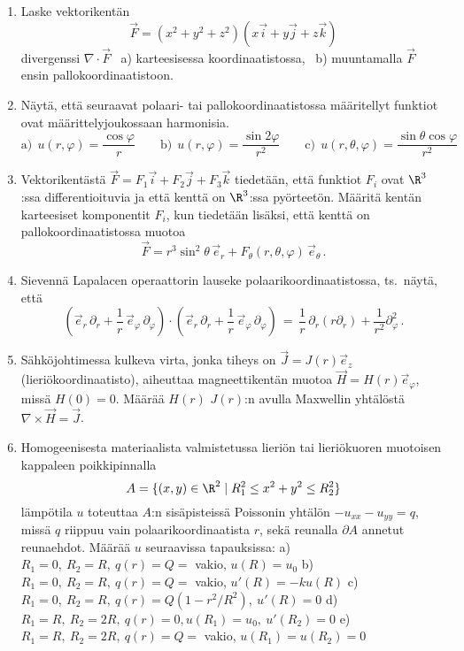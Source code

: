 \Harj
\begin{enumerate}

\item
Laske vektorikentän
\[
\vec F=(x^2+y^2+z^2)(x\vec i+y\vec j+z\vec k)
\]
divergenssi $\nabla\cdot\vec F$ \ a) karteesisessa koordinaatistossa, \ b) muuntamalla $\vec F$
ensin pallokoordinaatistoon.

\item
Näytä, että seuraavat polaari- tai pallokoordinaatistossa määritellyt funktiot ovat 
määrittelyjoukossaan harmonisia.
\[
\text{a)}\ \ u(r,\varphi)=\frac{\cos\varphi}{r} \qquad
\text{b)}\ \ u(r,\varphi)=\frac{\sin 2\varphi}{r^2} \qquad
\text{c)}\ \ u(r,\theta,\varphi)=\frac{\sin\theta\cos\varphi}{r^2}
\]

\item
Vektorikentästä $\vec F=F_1\vec i+F_2\vec j+F_3\vec k$ tiedetään, että funktiot $F_i$ ovat
$\R^3$:ssa differentioituvia ja että kenttä on $\R^3$:ssa pyörteetön. Määritä kentän karteesiset
komponentit $F_i$, kun tiedetään lisäksi, että kenttä on pallokoordinaatistossa muotoa
\[
\vec F = r^3\sin^2\theta\,\vec e_r + F_\theta(r,\theta,\varphi)\,\vec e_\theta\,.
\]

\item \label{H-udif-5: Laplacen operaattori}
Sievennä Lapalacen operaattorin lauseke polaarikoordinaatistossa, ts.\ näytä, että
\[
\left(\vec e_r\,\partial_r+\frac{1}{r}\,\vec e_\varphi\,\partial_\varphi\right)
        \cdot\left(\vec e_r\,\partial_r+\frac{1}{r}\,\vec e_\varphi\,\partial_\varphi\right)
 \,=\, \dfrac{1}{r}\,\partial_r(r\partial_r)+\dfrac{1}{r^2}\partial_\varphi^2\,.
\]

\item 
Sähköjohtimessa kulkeva virta, jonka tiheys on $\vec J = J(r)\vec e_z$ (lieriökoordinaatisto),
aiheuttaa magneettikentän muotoa $\vec H = H(r)\vec e_\varphi$, missä $H(0) = 0$. Määrää $H(r)$
$J(r)$:n avulla Maxwellin yhtälöstä $\nabla\times\vec H=\vec J$.

\item 
Homogeenisesta materiaalista valmistetussa lieriön tai lieriökuoren muotoisen kappaleen
poikkipinnalla
\[
A = \{(x,y)\in\R^2 \mid R_1^2 \le x^2 + y^2 \le R_2^2 \}
\]
lämpötila $u$ toteuttaa $A$:n sisäpisteissä Poissonin yhtälön $-u_{xx}-u_{yy}=q$, missä $q$ 
riippuu vain polaarikoordinaatista $r$, sekä reunalla $\partial A$ annetut reunaehdot. Määrää
$u$ seuraavissa tapauksissa:
\vspace{1mm}\newline
a) \ $R_1=0,\ R_2=R,\ q(r)=Q= $ vakio, $u(R)=u_0$ \newline
b) \ $R_1=0,\ R_2=R,\ q(r)=Q= $ vakio, $u'(R)=-ku(R)$ \newline 
c) \ $R_1=0,\ R_2=R,\ q(r)=Q(1-r^2/R^2),\ u'(R)=0$ \newline
d) \ $R_1=R,\ R_2=2R,\ q(r)=0, u(R_1)=u_0,\ u'(R_2)=0$ \newline
e) \ $R_1=R,\ R_2=2R,\ q(r)=Q= $ vakio, $u(R_1)=u(R_2)=0$


\end{enumerate}
